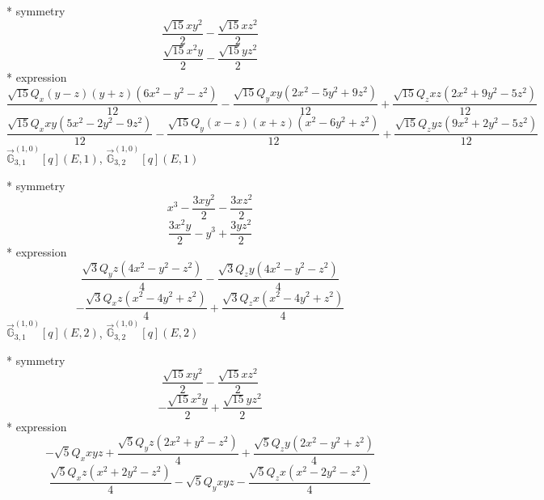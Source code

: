 \documentclass[fleqn,8pt]{jsarticle}
\begin{document}
\noindent\quad ** symmetry
\begin{dmath*}
\frac{\sqrt{15} x y^{2}}{2} - \frac{\sqrt{15} x z^{2}}{2}
\end{dmath*}
\begin{dmath*}
\frac{\sqrt{15} x^{2} y}{2} - \frac{\sqrt{15} y z^{2}}{2}
\end{dmath*}
\noindent\quad ** expression
\begin{dmath*}
\frac{\sqrt{15} Q_{x} \left(y - z\right) \left(y + z\right) \left(6 x^{2} - y^{2} - z^{2}\right)}{12} - \frac{\sqrt{15} Q_{y} x y \left(2 x^{2} - 5 y^{2} + 9 z^{2}\right)}{12} + \frac{\sqrt{15} Q_{z} x z \left(2 x^{2} + 9 y^{2} - 5 z^{2}\right)}{12}
\end{dmath*}
\begin{dmath*}
\frac{\sqrt{15} Q_{x} x y \left(5 x^{2} - 2 y^{2} - 9 z^{2}\right)}{12} - \frac{\sqrt{15} Q_{y} \left(x - z\right) \left(x + z\right) \left(x^{2} - 6 y^{2} + z^{2}\right)}{12} + \frac{\sqrt{15} Q_{z} y z \left(9 x^{2} + 2 y^{2} - 5 z^{2}\right)}{12}
\end{dmath*}
\noindent\quad $\vec{\mathbb{G}}_{3,1}^{(1,0)}[q](E,1)$, $\vec{\mathbb{G}}_{3,2}^{(1,0)}[q](E,1)$

\noindent\quad ** symmetry
\begin{dmath*}
x^{3} - \frac{3 x y^{2}}{2} - \frac{3 x z^{2}}{2}
\end{dmath*}
\begin{dmath*}
\frac{3 x^{2} y}{2} - y^{3} + \frac{3 y z^{2}}{2}
\end{dmath*}
\noindent\quad ** expression
\begin{dmath*}
\frac{\sqrt{3} Q_{y} z \left(4 x^{2} - y^{2} - z^{2}\right)}{4} - \frac{\sqrt{3} Q_{z} y \left(4 x^{2} - y^{2} - z^{2}\right)}{4}
\end{dmath*}
\begin{dmath*}
- \frac{\sqrt{3} Q_{x} z \left(x^{2} - 4 y^{2} + z^{2}\right)}{4} + \frac{\sqrt{3} Q_{z} x \left(x^{2} - 4 y^{2} + z^{2}\right)}{4}
\end{dmath*}
\noindent\quad $\vec{\mathbb{G}}_{3,1}^{(1,0)}[q](E,2)$, $\vec{\mathbb{G}}_{3,2}^{(1,0)}[q](E,2)$

\noindent\quad ** symmetry
\begin{dmath*}
\frac{\sqrt{15} x y^{2}}{2} - \frac{\sqrt{15} x z^{2}}{2}
\end{dmath*}
\begin{dmath*}
- \frac{\sqrt{15} x^{2} y}{2} + \frac{\sqrt{15} y z^{2}}{2}
\end{dmath*}
\noindent\quad ** expression
\begin{dmath*}
- \sqrt{5} Q_{x} x y z + \frac{\sqrt{5} Q_{y} z \left(2 x^{2} + y^{2} - z^{2}\right)}{4} + \frac{\sqrt{5} Q_{z} y \left(2 x^{2} - y^{2} + z^{2}\right)}{4}
\end{dmath*}
\begin{dmath*}
\frac{\sqrt{5} Q_{x} z \left(x^{2} + 2 y^{2} - z^{2}\right)}{4} - \sqrt{5} Q_{y} x y z - \frac{\sqrt{5} Q_{z} x \left(x^{2} - 2 y^{2} - z^{2}\right)}{4}
\end{dmath*}
\end{document}
